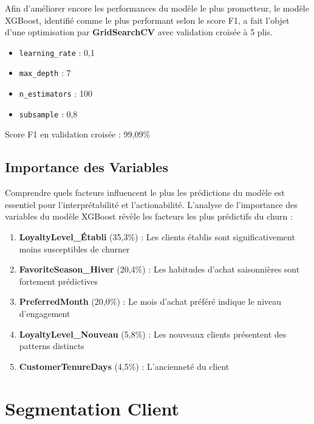 \documentclass[12pt,a4paper]{article}
\begin{document}
Afin d'améliorer encore les performances du modèle le plus prometteur, le modèle XGBoost, identifié comme le plus performant selon le score F1, a fait l'objet d'une optimisation par \textbf{GridSearchCV} avec validation croisée à 5 plis.

\begin{tcolorbox}[title=Hyperparamètres optimaux - XGBoost, colback=white, colframe=black]
\begin{itemize}
    \item \texttt{learning\_rate} : 0,1
    \item \texttt{max\_depth} : 7
    \item \texttt{n\_estimators} : 100
    \item \texttt{subsample} : 0,8
\end{itemize}
Score F1 en validation croisée : 99,09\%
\end{tcolorbox}

\subsection{Importance des Variables}

Comprendre quels facteurs influencent le plus les prédictions du modèle est essentiel pour l'interprétabilité et l'actionabilité. L'analyse de l'importance des variables du modèle XGBoost révèle les facteurs les plus prédictifs du churn :

\begin{enumerate}
    \item \textbf{LoyaltyLevel\_Établi} (35,3\%) : Les clients établis sont significativement moins susceptibles de churner
    \item \textbf{FavoriteSeason\_Hiver} (20,4\%) : Les habitudes d'achat saisonnières sont fortement prédictives
    \item \textbf{PreferredMonth} (20,0\%) : Le mois d'achat préféré indique le niveau d'engagement
    \item \textbf{LoyaltyLevel\_Nouveau} (5,8\%) : Les nouveaux clients présentent des patterns distincts
    \item \textbf{CustomerTenureDays} (4,5\%) : L'ancienneté du client
\end{enumerate}

\section{Segmentation Client}
\end{document}
